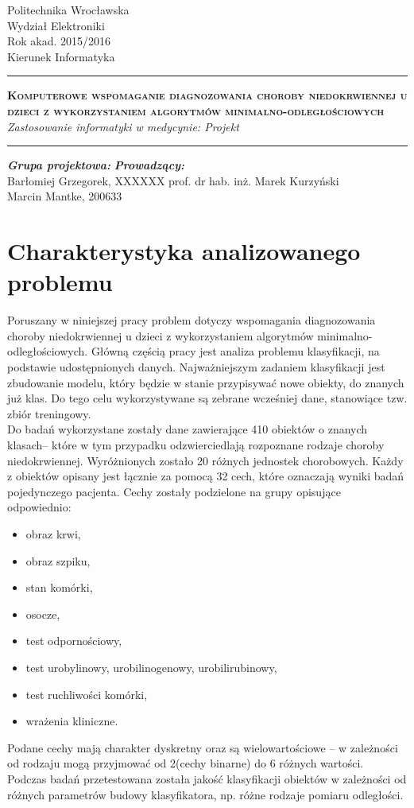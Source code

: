 \documentclass[11pt, a4paper, titlepage]{report}
\date{Wrocław, 06.06.2016}
\makeatletter
\renewcommand{\maketitle}{\begin{titlepage}
		\begin{center}\small
			Politechnika Wrocławska\\
			Wydział Elektroniki\\
			Rok akad. 2015/2016\\
			Kierunek Informatyka\\
			\vspace{3cm}
			\rule{\linewidth}{0.4pt}
				\huge \textsc{\textbf{Komputerowe wspomaganie diagnozowania choroby niedokrwiennej u dzieci z wykorzystaniem algorytmów minimalno-odległościowych}}
				\vspace{0.5cm} \\
				\normalsize \textit{Zastosowanie informatyki w medycynie: Projekt}
			\rule{\linewidth}{0.4pt}
		\end{center}

		\vspace{3cm}
		\begin{flushleft}
			\textbf{\textit{Grupa projektowa:}} \hspace{6.5cm} \textbf{\textit{Prowadzący:}} \\
			Barłomiej Grzegorek, XXXXXX \hfill{prof. dr hab. inż. Marek Kurzyński} \\
			Marcin Mantke, 200633\\
			\vspace{2cm}
		\end{flushleft}
		\vspace*{\stretch{6}}
		\begin{center}
			\@date
		\end{center}
	\end{titlepage}%
}
\makeatother
\begin{document}
\maketitle
\tableofcontents
\cleardoublepage
{}
{}
\listoffigures

\cleardoublepage
{}
{}
\lstlistoflistings
\chapter{Charakterystyka analizowanego problemu}
\label{chap:Charakterystyka analizowanego problemu}
Poruszany w niniejszej pracy problem dotyczy wspomagania diagnozowania choroby niedokrwiennej u  dzieci z wykorzystaniem algorytmów minimalno-odległościowych. Główną częścią pracy jest analiza problemu klasyfikacji, na podstawie udostępnionych danych. Najważniejszym zadaniem klasyfikacji jest zbudowanie modelu, który będzie w stanie przypisywać nowe obiekty, do znanych już klas. Do tego celu wykorzystywane są zebrane wcześniej dane, stanowiące tzw. zbiór treningowy.\\

Do badań wykorzystane zostały dane zawierające 410 obiektów o znanych klasach– które w tym przypadku odzwierciedlają rozpoznane rodzaje choroby niedokrwiennej. Wyróżnionych zostało 20 różnych jednostek chorobowych. Każdy z obiektów opisany jest łącznie za pomocą 32 cech, które oznaczają wyniki badań pojedynczego pacjenta. Cechy zostały podzielone na grupy opisujące odpowiednio:
\begin{itemize}
  \item obraz krwi,
  \item obraz szpiku,
  \item stan komórki,
  \item osocze,
  \item test odpornościowy,
  \item test urobylinowy, urobilinogenowy, urobilirubinowy,
  \item test ruchliwości komórki,
  \item wrażenia kliniczne.
\end{itemize}

Podane cechy mają charakter dyskretny oraz są wielowartościowe – w zależności od rodzaju mogą przyjmować od 2(cechy binarne) do 6 różnych wartości.\\
Podczas badań przetestowana została jakość klasyfikacji obiektów w zależności od różnych parametrów budowy klasyfikatora, np. różne rodzaje pomiaru odległości.
\end{document}
